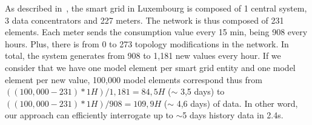 As described in~\cite{DBLP:conf/smartgridcomm/0001FKTPTR14}, the smart grid in Luxembourg is composed of 1 central system, 3 data concentrators and 227 meters.
The network is thus composed of 231 elements.
Each meter sends the consumption value every 15 min, being 908 every hours.
Plus, there is from 0 to 273 topology modifications in the network.
In total, the system generates from 908 to 1,181 new values every hour.
If we consider that we have one model element per smart grid entity and one model element per new value, 100,000 model elements correspond thus from $((100,000 - 231) * 1H ) / 1,181 = 84,5H$ ($\sim$ 3,5 days) to $((100,000 - 231) * 1H ) / 908 = 109,9H$ ($\sim$ 4,6 days) of data. In other word, our approach can efficiently interrogate up to $\sim$5 days history data in 2.4s.

